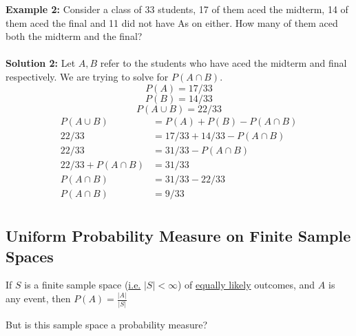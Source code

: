 \documentclass[12pt, twoside]{article}
\begin{document}
\textbf{Example 2:} Consider a class of 33 students, 17 of them aced the midterm, 14 of them aced the final and 11 did not have As on either. How many of them aced both the midterm and the final?\\
\\
\textbf{Solution 2:} Let $A,B$ refer to the students who have aced the midterm and final respectively. We are trying to solve for $P(A \cap B)$.\\
$$P(A) = 17/33$$
$$P(B) = 14/33$$
$$P(A \cup B) = 22/33$$
\begin{align*}
	P(A \cup B) &= P(A) + P(B) - P(A \cap B)\\
	22/33 &= 17/33 + 14/33 - P(A \cap B)\\
	22/33 &= 31/33 - P(A \cap B)\\
	22/33 + P(A \cap B) &= 31/33\\
	P(A \cap B) &= 31/33 - 22/33\\
	P(A \cap B) &= 9/33\\
\end{align*}

\subsection{Uniform Probability Measure on Finite Sample Spaces}

\begin{tcolorbox}[title=Uniform Probability Measure on Finite Sample Spaces (UPMFSS)]
	If $S$ is a finite sample space (\underline{i.e.} $|S| < \infty$) of \underline{equally likely} outcomes, and $A$ is any event, then $P(A) = \frac{|A|}{|S|}$
\end{tcolorbox}

But is this sample space a probability measure?
\end{document}
